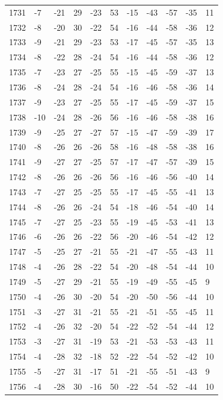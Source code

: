 \begin{table}[H]
\begin{tabular}{lllllllllll}
1731 & -7 & -21 & 29 & -23 & 53 & -15 & -43 & -57 & -35 & 11 \\
1732 & -8 & -20 & 30 & -22 & 54 & -16 & -44 & -58 & -36 & 12 \\
1733 & -9 & -21 & 29 & -23 & 53 & -17 & -45 & -57 & -35 & 13 \\
1734 & -8 & -22 & 28 & -24 & 54 & -16 & -44 & -58 & -36 & 12 \\
1735 & -7 & -23 & 27 & -25 & 55 & -15 & -45 & -59 & -37 & 13 \\
1736 & -8 & -24 & 28 & -24 & 54 & -16 & -46 & -58 & -36 & 14 \\
1737 & -9 & -23 & 27 & -25 & 55 & -17 & -45 & -59 & -37 & 15 \\
1738 & -10 & -24 & 28 & -26 & 56 & -16 & -46 & -58 & -38 & 16 \\
1739 & -9 & -25 & 27 & -27 & 57 & -15 & -47 & -59 & -39 & 17 \\
1740 & -8 & -26 & 26 & -26 & 58 & -16 & -48 & -58 & -38 & 16 \\
1741 & -9 & -27 & 27 & -25 & 57 & -17 & -47 & -57 & -39 & 15 \\
1742 & -8 & -26 & 26 & -26 & 56 & -16 & -46 & -56 & -40 & 14 \\
1743 & -7 & -27 & 25 & -25 & 55 & -17 & -45 & -55 & -41 & 13 \\
1744 & -8 & -26 & 26 & -24 & 54 & -18 & -46 & -54 & -40 & 14 \\
1745 & -7 & -27 & 25 & -23 & 55 & -19 & -45 & -53 & -41 & 13 \\
1746 & -6 & -26 & 26 & -22 & 56 & -20 & -46 & -54 & -42 & 12 \\
1747 & -5 & -25 & 27 & -21 & 55 & -21 & -47 & -55 & -43 & 11 \\
1748 & -4 & -26 & 28 & -22 & 54 & -20 & -48 & -54 & -44 & 10 \\
1749 & -5 & -27 & 29 & -21 & 55 & -19 & -49 & -55 & -45 & 9 \\
1750 & -4 & -26 & 30 & -20 & 54 & -20 & -50 & -56 & -44 & 10 \\
1751 & -3 & -27 & 31 & -21 & 55 & -21 & -51 & -55 & -45 & 11 \\
1752 & -4 & -26 & 32 & -20 & 54 & -22 & -52 & -54 & -44 & 12 \\
1753 & -3 & -27 & 31 & -19 & 53 & -21 & -53 & -53 & -43 & 11 \\
1754 & -4 & -28 & 32 & -18 & 52 & -22 & -54 & -52 & -42 & 10 \\
1755 & -5 & -27 & 31 & -17 & 51 & -21 & -55 & -51 & -43 & 9 \\
1756 & -4 & -28 & 30 & -16 & 50 & -22 & -54 & -52 & -44 & 10 \\

\end{tabular}
\end{table}
